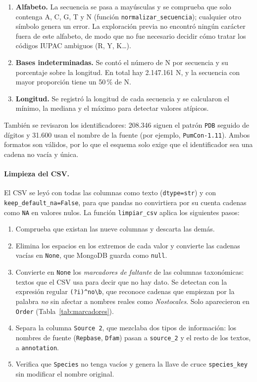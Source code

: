 \documentclass[pdflatex,lineno,referee,sn-vancouver-num]{sn-jnl}
\theoremstyle{thmstyleone}%
\theoremstyle{thmstyletwo}%
\theoremstyle{thmstylethree}%
\begin{document}
\begin{enumerate}
  \item \textbf{Alfabeto.} La secuencia se pasa a mayúsculas y se comprueba que solo contenga A, C, G, T y N (función \texttt{normalizar\_secuencia}); cualquier otro símbolo genera un error. La exploración previa no encontró ningún carácter fuera de este alfabeto, de modo que no fue necesario decidir cómo tratar los códigos IUPAC ambiguos (R, Y, K\ldots).
  \item \textbf{Bases indeterminadas.} Se contó el número de N por secuencia y su porcentaje sobre la longitud. En total hay 2.147.161 N, y la secuencia con mayor proporción tiene un 50\,\% de N.
  \item \textbf{Longitud.} Se registró la longitud de cada secuencia y se calcularon el mínimo, la mediana y el máximo para detectar valores atípicos.
\end{enumerate}

También se revisaron los identificadores: 208.346 siguen el patrón \texttt{PDB} seguido de dígitos y 31.600 usan el nombre de la fuente (por ejemplo, \texttt{PumCon-1.11}). Ambos formatos son válidos, por lo que el esquema solo exige que el identificador sea una cadena no vacía y única.

\paragraph{Limpieza del CSV.} El CSV se leyó con todas las columnas como texto (\texttt{dtype=str}) y con \texttt{keep\_default\_na=False}, para que pandas no convirtiera por su cuenta cadenas como \texttt{NA} en valores nulos. La función \texttt{limpiar\_csv} aplica los siguientes pasos:

\begin{enumerate}
  \item Comprueba que existan las nueve columnas y descarta las demás.
  \item Elimina los espacios en los extremos de cada valor y convierte las cadenas vacías en \texttt{None}, que MongoDB guarda como \texttt{null}.
  \item Convierte en \texttt{None} los \emph{marcadores de faltante} de las columnas taxonómicas: textos que el CSV usa para decir que no hay dato. Se detectan con la expresión regular \verb|(?i)^no\b|, que reconoce cadenas que empiezan por la palabra \emph{no} sin afectar a nombres reales como \textit{Nostocales}. Solo aparecieron en \texttt{Order} (Tabla~\ref{tab:marcadores}).
  \item Separa la columna \texttt{Source 2}, que mezclaba dos tipos de información: los nombres de fuente (\texttt{Repbase}, \texttt{Dfam}) pasan a \texttt{source\_2} y el resto de los textos, a \texttt{annotation}.
  \item Verifica que \texttt{Species} no tenga vacíos y genera la llave de cruce \texttt{species\_key} sin modificar el nombre original.
\end{enumerate}
\end{document}
